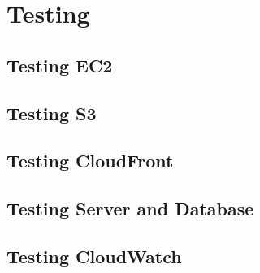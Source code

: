 \chapter{Testing}
\section{Testing EC2}
\section{Testing S3}
\section{Testing CloudFront}
\section{Testing Server and Database}
\section{Testing CloudWatch}